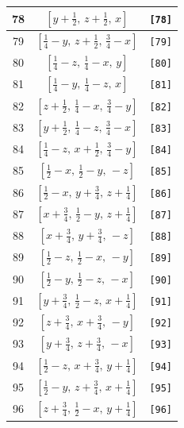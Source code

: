 \documentclass[fleqn,8pt]{jsarticle}
\begin{document}
\begin{longtable}{ccc}
78 & $\left[ y + \frac{1}{2},\, z + \frac{1}{2},\, x \right]$ & {\tt [78]} \\ \hline
79 & $\left[ \frac{1}{4} - y,\, z + \frac{1}{2},\, \frac{3}{4} - x \right]$ & {\tt [79]} \\ \hline
80 & $\left[ \frac{1}{4} - z,\, \frac{1}{4} - x,\, y \right]$ & {\tt [80]} \\ \hline
81 & $\left[ \frac{1}{4} - y,\, \frac{1}{4} - z,\, x \right]$ & {\tt [81]} \\ \hline
82 & $\left[ z + \frac{1}{2},\, \frac{1}{4} - x,\, \frac{3}{4} - y \right]$ & {\tt [82]} \\ \hline
83 & $\left[ y + \frac{1}{2},\, \frac{1}{4} - z,\, \frac{3}{4} - x \right]$ & {\tt [83]} \\ \hline
84 & $\left[ \frac{1}{4} - z,\, x + \frac{1}{2},\, \frac{3}{4} - y \right]$ & {\tt [84]} \\ \hline
85 & $\left[ \frac{1}{2} - x,\, \frac{1}{2} - y,\, - z \right]$ & {\tt [85]} \\ \hline
86 & $\left[ \frac{1}{2} - x,\, y + \frac{3}{4},\, z + \frac{1}{4} \right]$ & {\tt [86]} \\ \hline
87 & $\left[ x + \frac{3}{4},\, \frac{1}{2} - y,\, z + \frac{1}{4} \right]$ & {\tt [87]} \\ \hline
88 & $\left[ x + \frac{3}{4},\, y + \frac{3}{4},\, - z \right]$ & {\tt [88]} \\ \hline
89 & $\left[ \frac{1}{2} - z,\, \frac{1}{2} - x,\, - y \right]$ & {\tt [89]} \\ \hline
90 & $\left[ \frac{1}{2} - y,\, \frac{1}{2} - z,\, - x \right]$ & {\tt [90]} \\ \hline
91 & $\left[ y + \frac{3}{4},\, \frac{1}{2} - z,\, x + \frac{1}{4} \right]$ & {\tt [91]} \\ \hline
92 & $\left[ z + \frac{3}{4},\, x + \frac{3}{4},\, - y \right]$ & {\tt [92]} \\ \hline
93 & $\left[ y + \frac{3}{4},\, z + \frac{3}{4},\, - x \right]$ & {\tt [93]} \\ \hline
94 & $\left[ \frac{1}{2} - z,\, x + \frac{3}{4},\, y + \frac{1}{4} \right]$ & {\tt [94]} \\ \hline
95 & $\left[ \frac{1}{2} - y,\, z + \frac{3}{4},\, x + \frac{1}{4} \right]$ & {\tt [95]} \\ \hline
96 & $\left[ z + \frac{3}{4},\, \frac{1}{2} - x,\, y + \frac{1}{4} \right]$ & {\tt [96]} \\
\end{longtable}
\end{document}
